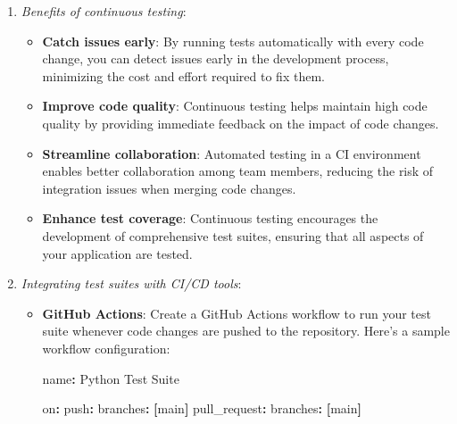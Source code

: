 \documentclass[
  paper=a4,
  ,captions=tableheading
]{scrartcl}
\newenvironment{Shaded}{}{}
\newcommand{\AttributeTok}[1]{\textcolor[rgb]{0.49,0.56,0.16}{#1}}
\newcommand{\FunctionTok}[1]{\textcolor[rgb]{0.02,0.16,0.49}{#1}}
\newcommand{\KeywordTok}[1]{\textcolor[rgb]{0.00,0.44,0.13}{\textbf{#1}}}
\providecommand{\tightlist}{%
  \setlength{\itemsep}{0pt}\setlength{\parskip}{0pt}}
\begin{document}
\begin{enumerate}
\def\labelenumi{\arabic{enumi}.}
\item
  \emph{Benefits of continuous testing}:

  \begin{itemize}
  \tightlist
  \item
    \textbf{Catch issues early}: By running tests automatically with
    every code change, you can detect issues early in the development
    process, minimizing the cost and effort required to fix them.
  \item
    \textbf{Improve code quality}: Continuous testing helps maintain
    high code quality by providing immediate feedback on the impact of
    code changes.
  \item
    \textbf{Streamline collaboration}: Automated testing in a CI
    environment enables better collaboration among team members,
    reducing the risk of integration issues when merging code changes.
  \item
    \textbf{Enhance test coverage}: Continuous testing encourages the
    development of comprehensive test suites, ensuring that all aspects
    of your application are tested.
  \end{itemize}
\item
  \emph{Integrating test suites with CI/CD tools}:

  \begin{itemize}
  \item
    \textbf{GitHub Actions}: Create a GitHub Actions workflow to run
    your test suite whenever code changes are pushed to the repository.
    Here's a sample workflow configuration:

\begin{Shaded}
\begin{Highlighting}[]
\FunctionTok{name}\KeywordTok{:}\AttributeTok{ Python Test Suite}

\FunctionTok{on}\KeywordTok{:}
\AttributeTok{  }\FunctionTok{push}\KeywordTok{:}
\AttributeTok{    }\FunctionTok{branches}\KeywordTok{:}\AttributeTok{ }\KeywordTok{[}\AttributeTok{main}\KeywordTok{]}
\AttributeTok{  }\FunctionTok{pull\_request}\KeywordTok{:}
\AttributeTok{    }\FunctionTok{branches}\KeywordTok{:}\AttributeTok{ }\KeywordTok{[}\AttributeTok{main}\KeywordTok{]}


\end{Highlighting}
\end{Shaded}
\end{itemize}
\end{enumerate}
\end{document}
